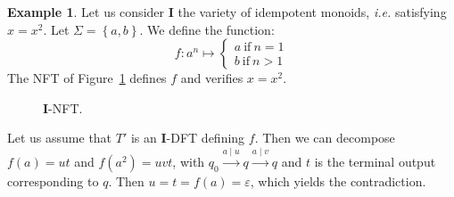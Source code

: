 \documentclass[12pt]{report}
\theoremstyle{definition}
\newtheorem{xmp}{Example}[section]
\theoremstyle{remark}
\begin{document}
\begin{xmp}

Let us consider \textbf I the variety of idempotent monoids, \emph{i.e.} satisfying $x=x^2$.
Let $\Sigma=\left\{a,b\right\}$.
We define the function:
$$f: a^n\mapsto\left\{ \begin{array}{c} a\ \mathrm{if}\ n=1\\ b\ \mathrm{if}\ n>1   \end{array} \right.$$
The NFT of Figure~\ref{det1} defines $f$ and verifies $x=x^2$.

\begin{figure}[t]
\centering


\caption{\textbf I-NFT.}
\label{det1}
\end{figure}

Let us assume that $T'$ is an \textbf I-DFT defining $f$. Then we can decompose $f(a)=ut$ and $f(a^2)=uvt$, with $q_0\xrightarrow{a\mid u}q\xrightarrow{a\mid v}q$ and $t$ is the terminal output corresponding to $q$. Then $u=t=f(a)=\varepsilon$, which yields the contradiction.
\end{xmp}
\end{document}
